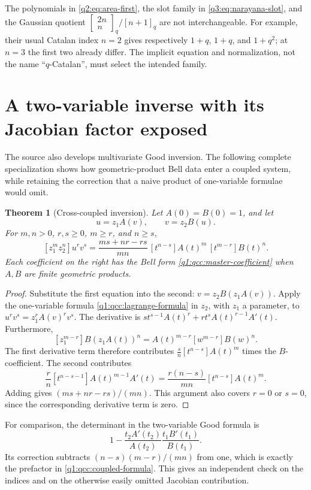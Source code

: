 \documentclass[11pt,a4paper,oneside,openany]{book}
\newtheorem{theorem}{Theorem}[chapter]
\theoremstyle{definition}
\theoremstyle{remark}
\newcommand{\GB}[3][q]{\begin{bmatrix}#2\\#3\end{bmatrix}_{#1}}
\newcommand{\qi}[2][q]{[#2]_{#1}}
\newcommand{\qb}[2]{\GB{#1}{#2}}
\begin{document}
The polynomials in \eqref{q2:eq:area-first}, the slot family in \eqref{q3:eq:narayana-slot},
and the Gaussian quotient $\qb{2n}n/\qi{n+1}$ are not interchangeable.
For example, their usual Catalan index $n=2$ gives respectively $1+q$,
$1+q$, and $1+q^2$; at $n=3$ the first two already differ. The implicit equation
and normalization, not the name ``$q$-Catalan'', must select the intended family.
\section{A two-variable inverse with its Jacobian factor exposed}
The source also develops multivariate Good inversion. The following complete
specialization shows how geometric-product Bell data enter a coupled system,
while retaining the correction that a naive product of one-variable formulae
would omit.

\begin{theorem}[Cross-coupled inversion]\label{q1:qcc:coupled}
Let \(A(0)=B(0)=1\), and let
\[
 u=z_1A(v),\qquad v=z_2B(u).
\]
For \(m,n>0\), \(r,s\ge0\), \(m\ge r\), and \(n\ge s\),
\begin{equation}\label{q1:qcc:coupled-formula}
 [z_1^mz_2^n]u^rv^s
 =\frac{ms+nr-rs}{mn}\,
 [t^{n-s}]A(t)^m\,[t^{m-r}]B(t)^n.
\end{equation}
Each coefficient on the right has the Bell form
\eqref{q1:qcc:master-coefficient} when \(A,B\) are finite geometric products.
\end{theorem}
\begin{proof}
Substitute the first equation into the second:
\(v=z_2B(z_1A(v))\). Apply the one-variable formula
\eqref{q1:qcc:lagrange-formula} in \(z_2\), with \(z_1\) a parameter, to
\(u^rv^s=z_1^rA(v)^rv^s\). The derivative is
\(s t^{s-1}A(t)^r+r t^sA(t)^{r-1}A'(t)\).
Furthermore,
\[
 [z_1^{m-r}]B(z_1A(t))^n
 =A(t)^{m-r}[w^{m-r}]B(w)^n.
\]
The first derivative term therefore contributes
\(\frac{s}{n}[t^{n-s}]A(t)^m\) times the \(B\)-coefficient. The second
contributes
\[
 \frac{r}{n}[t^{n-s-1}]A(t)^{m-1}A'(t)
 =\frac{r(n-s)}{mn}[t^{n-s}]A(t)^m.
\]
Adding gives \((ms+nr-rs)/(mn)\). This argument also covers \(r=0\) or
\(s=0\), since the corresponding derivative term is zero.
\end{proof}
For comparison, the determinant in the two-variable Good formula is
\[
 1-\frac{t_2A'(t_2)}{A(t_2)}\frac{t_1B'(t_1)}{B(t_1)}.
\]
Its correction subtracts \((n-s)(m-r)/(mn)\) from one, which is exactly the
prefactor in \eqref{q1:qcc:coupled-formula}. This gives an independent check on the
indices and on the otherwise easily omitted Jacobian contribution.
\end{document}
